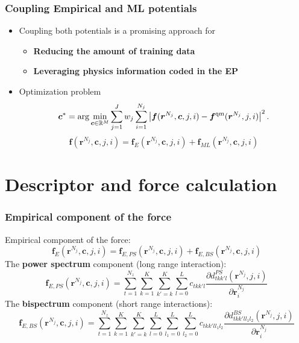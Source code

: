 \documentclass[10pt]{beamer}
\theoremstyle{remark}
\theoremstyle{definition}
\begin{document}


\begin{frame}
\frametitle{Coupling Empirical and ML potentials}

\begin{itemize}
\item Coupling both potentials is a promising approach for
	\begin{itemize}
    	\item \textbf{Reducing the amount of training data}
	    \item \textbf{Leveraging physics information coded in the EP}
	\end{itemize}
\pause
\item Optimization problem
\begin{equation*}
\bm c^* = \arg \min_{\bm c \in \mathbb{R}^M } \sum_{j=1}^J w_j \sum_{i=1}^{N_j}  \left|\bm f(\bm {r}^{N_j}, \bm c, j, i) - \bm f^{\rm qm}(\bm r^{N_j}, j, i) \right|^2.
\end{equation*}
\pause
\begin{equation*}
    \bm f(\bm {r}^{N_j}, \bm c, j, i) = 
    \bm f_{E}(\bm {r}^{N_j}, \bm c, j, i) +
    \bm f_{ML}(\bm {r}^{N_j}, \bm c, j, i)
\end{equation*}
\end{itemize}
\end{frame}



\section{Descriptor and force calculation}


\begin{frame}
\frametitle{Empirical component of the force}

Empirical component of the force:
\begin{equation*}
    \bm f_E(\bm {r}^{N_j}, \bm c, j, i) = 
    \bm f_{E,PS}(\bm {r}^{N_j}, \bm c, j, i) +
    \bm f_{E,BS}(\bm {r}^{N_j}, \bm c, j, i)
    \label{eq:force}
\end{equation*}
\pause
The \textbf{power spectrum} component (long range interaction):
\begin{equation*}
    \bm f_{E,PS}(\bm {r}^{N_j}, \bm c, j, i) = 
    \sum_{t=1}^{N_z}
    \sum_{k=1}^K
    \sum_{k'=k}^{K}
    \sum_{l=0}^L
    c_{tkk'l}
    \frac{\partial d^{PS}_{tkk'l}(\bm r^{N_j}, j, i)}{\partial \bm r^{N_j}_i}
    \label{eq:force}
\end{equation*}
\pause
The \textbf{bispectrum} component (short range interactions):
\begin{equation*}
    \bm f_{E,BS}(\bm {r}^{N_j}, \bm c, j, i) = 
    \sum_{t=1}^{N_z}
    \sum_{k=1}^K
    \sum_{k'=k}^{K}
    \sum_{l=0}^L
    \sum_{l_1=0}^L
    \sum_{l_2=0}^L
    c_{tkk'l{l_1}{l_2}}
    \frac{\partial d^{BS}_{tkk'l{l_1}{l_2}}(\bm r^{N_j}, j, i)}{\partial \bm r^{N_j}_i}
    \label{eq:force}
\end{equation*}


\end{frame}
 
\end{document}
